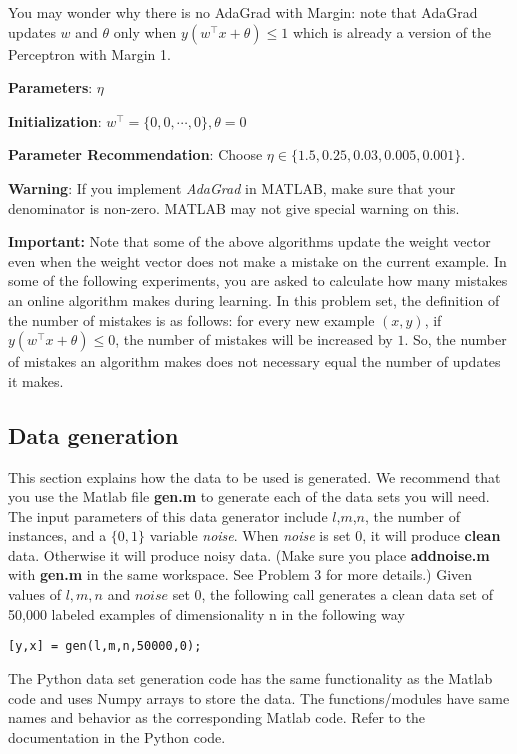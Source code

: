 \begin{enumerate}
You may wonder why there is no AdaGrad with Margin: note that AdaGrad
updates $w$ and $\theta$ only when $y(w^\intercal x+\theta) \le 1$ which is
already a version of the Perceptron with Margin 1.

  {\bf Parameters}: $\eta$

  {\bf Initialization}: $w^\intercal=\{0,0,\cdots,0\},\theta=0$

  {\bf Parameter Recommendation}: Choose $\eta \in \{1.5,0.25,0.03,0.005,0.001\}$.

  {\bf Warning}: If you implement \emph{AdaGrad} in MATLAB, make sure
that your denominator is non-zero. MATLAB may not give special warning
on this.

\end{enumerate}

{\bf Important:} Note that some of the above algorithms
update the weight vector even when the weight vector does not make a
mistake on the current example.  In some of the following experiments,
you are asked to calculate how many mistakes an online algorithm makes
during learning.  In this problem set, the definition of the number of
mistakes is as follows: for every new example $(x,y)$, if
$y(w^\intercal x + \theta) \leq 0$, the number of mistakes will be
increased by $1$. So, the number of mistakes an algorithm makes does
not necessary equal the number of updates it makes.

\subsection*{Data generation}
This section explains how the data to be used is generated. We recommend that you use the Matlab file {\bf gen.m} to generate each of the data sets you will need. The input parameters of this data generator include $l$,$m$,$n$, the number of instances, and a $\{0, 1\}$ variable \emph{noise}. When \emph{noise} is set 0, it will produce {\bf clean} data. Otherwise it will produce noisy data. (Make sure you place {\bf addnoise.m} with {\bf gen.m} in the same workspace. See Problem 3 for more details.) Given values of $l, m, n$ and $noise$ set 0, the following call generates a clean data set of 50,000 labeled examples of dimensionality n in the following way

\begin{verbatim}
[y,x] = gen(l,m,n,50000,0);
\end{verbatim}

The Python data set generation code has the same functionality as the Matlab code
and uses Numpy arrays to store the data. The functions/modules have same names and 
behavior as the corresponding Matlab code. Refer to the documentation in the Python code.



